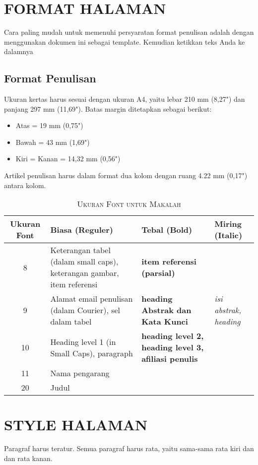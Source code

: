\documentclass[10pt,twocolumn]{article}
\newcommand{\eightp}{\fontsize{8}{9.6}\selectfont}
\begin{document}
\section{\MakeUppercase{Format Halaman}}
Cara paling mudah untuk memenuhi persyaratan format penulisan adalah dengan menggunakan dokumen ini sebagai template. Kemudian ketikkan teks Anda ke dalamnya

\subsection{Format Penulisan}
Ukuran kertas harus sesuai dengan ukuran A4, yaitu lebar 210 mm (8,27") dan panjang 297 mm (11,69"). Batas margin ditetapkan sebagai berikut:
\begin{itemize}
\item Atas = 19 mm (0,75")
\item Bawah = 43 mm (1,69")
\item Kiri = Kanan = 14,32 mm (0,56")
\end{itemize}

Artikel penulisan harus dalam format dua kolom dengan ruang 4.22 mm (0,17") antara kolom.

\begin{table}[h]
\centering
\caption{{\eightp\textsc{Ukuran Font untuk Makalah}}}
\label{tab:font_sizes}
{\eightp
\begin{tabular}{|c|p{2.5cm}|p{1.8cm}|p{1.8cm}|}
\hline
\textbf{Ukuran Font} & \textbf{Biasa (Reguler)} & \textbf{Tebal (Bold)} & \textbf{Miring (Italic)} \\
\hline
8 & Keterangan tabel (dalam small caps), keterangan gambar, item referensi & \textbf{item referensi (parsial)} & \\
\hline
9 & Alamat email penulisan (dalam Courier), sel dalam tabel & \textbf{heading Abstrak dan Kata Kunci} & \textit{isi abstrak, heading} \\
\hline
10 & Heading level 1 (in Small Caps), paragraph & \textbf{heading level 2, heading level 3, afiliasi penulis} & \\
\hline
11 & Nama pengarang & & \\
\hline
20 & Judul & & \\
\hline
\end{tabular}
}
\end{table}

\section{\MakeUppercase{Style Halaman}}
Paragraf harus teratur. Semua paragraf harus rata, yaitu sama-sama rata kiri dan dan rata kanan.
\end{document}
